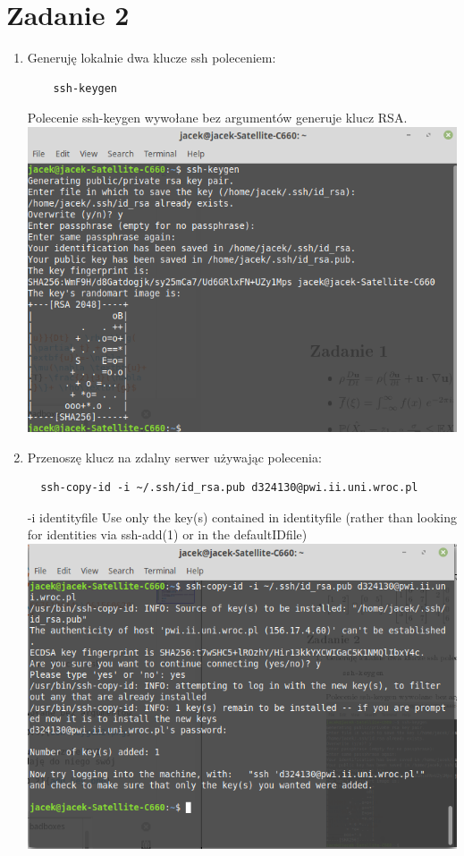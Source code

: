 \documentclass{article}
\begin{document}
\section*{Zadanie 2}
\begin{enumerate}
 \item Generuję lokalnie dwa klucze ssh poleceniem: 
 \begin{verbatim}
    ssh-keygen
 \end{verbatim}
 Polecenie ssh-keygen wywołane bez argumentów generuje klucz RSA.\\
 \includegraphics[scale=0.4]{ssh-keygen2.png}
 \item Przenoszę klucz na zdalny serwer używając polecenia:
 \begin{verbatim}
  ssh-copy-id -i ~/.ssh/id_rsa.pub d324130@pwi.ii.uni.wroc.pl
 \end{verbatim}
 -i identityfile Use only the key(s) contained in identityfile (rather than looking for identities via ssh-add(1) or in the defaultIDfile)\cite{sshcopy}
 \\
 \includegraphics[scale=0.4]{ssh-copy-id2.png}


\end{enumerate}
\end{document}
